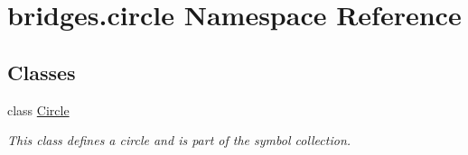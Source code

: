 \hypertarget{namespacebridges_1_1circle}{}\section{bridges.\+circle Namespace Reference}
\label{namespacebridges_1_1circle}
\subsection*{Classes}
\begin{DoxyCompactItemize}
\item 
class \hyperlink{classbridges_1_1circle_1_1_circle}{Circle}
\begin{DoxyCompactList}\small\item\em This class defines a circle and is part of the symbol collection. \end{DoxyCompactList}\end{DoxyCompactItemize}

